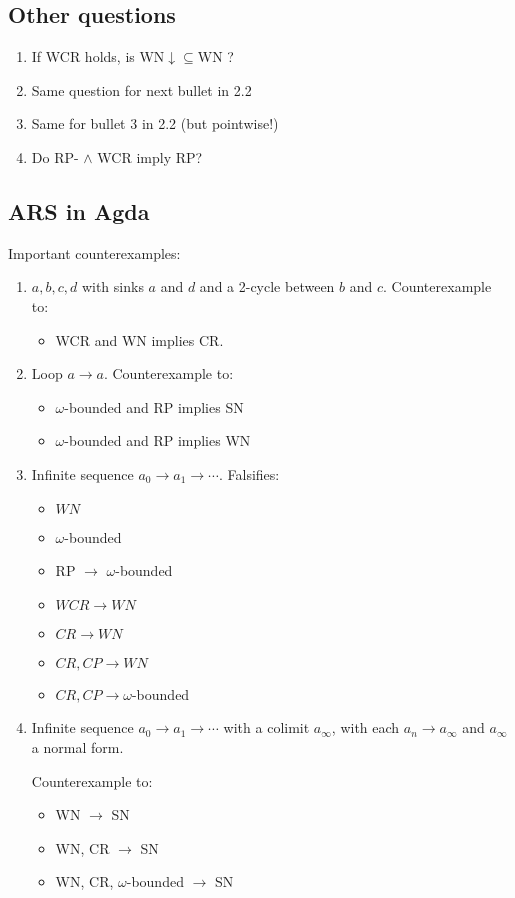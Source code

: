 \documentclass{article}
\begin{document}
\subsection{Other questions}
\begin{enumerate}
  \item If WCR holds, is WN$\downarrow\subseteq$WN ?
  \item Same question for next bullet in 2.2
  \item Same for bullet 3 in 2.2 (but pointwise!)
  \item Do RP- $\land$ WCR imply RP?
\end{enumerate}
\subsection{ARS in Agda}
Important counterexamples:
\begin{enumerate}
  \item $a,b,c,d$ with sinks $a$ and $d$ and a 2-cycle between $b$ and $c$.
  Counterexample to:
  \begin{itemize}
      \item WCR and WN implies CR.
  \end{itemize}
  \item Loop $a \to a$.
  Counterexample to:
  \begin{itemize}
    \item $\omega$-bounded and RP implies SN
    \item $\omega$-bounded and RP implies WN
  \end{itemize}
  \item Infinite sequence $a_0 \to a_1 \to \cdots$. Falsifies:
  \begin{itemize}
    \item $WN$
    \item $\omega$-bounded
    \item RP $\to$ $\omega$-bounded
    \item $WCR \to WN$
    \item $CR \to WN$
    \item $CR, CP \to WN$
    \item $CR, CP \to \omega$-bounded
  \end{itemize}
  \item Infinite sequence $a_0 \to a_1 \to \cdots$ with a colimit $a_\infty$,
  with each $a_n \to a_\infty$ and $a_\infty$ a normal form.

  Counterexample to:
  \begin{itemize}
    \item WN $\to$ SN
    \item WN, CR $\to$ SN
    \item WN, CR, $\omega$-bounded $\to$ SN
  \end{itemize}


\end{enumerate}
\end{document}
